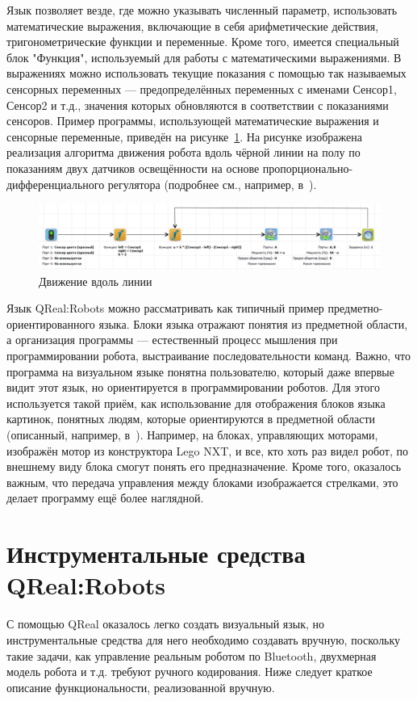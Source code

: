 \documentclass[a4paper]{article}
\begin{document}
Язык позволяет везде, где можно указывать численный параметр, использовать математические выражения, включающие в себя арифметические действия, тригонометрические функции и переменные. Кроме того, имеется специальный блок "Функция", используемый для работы с математическими выражениями. В выражениях можно использовать текущие показания с помощью так называемых сенсорных переменных --- предопределённых переменных с именами Сенсор1, Сенсор2 и т.д., значения которых обновляются в соответствии с показаниями сенсоров. Пример программы, использующей математические выражения и сенсорные переменные, приведён на рисунке~\ref{movingAlongTheLine}. На рисунке изображена реализация алгоритма движения робота вдоль чёрной линии на полу по показаниям двух датчиков освещённости на основе пропорционально-дифференциального регулятора (подробнее см., например, в~\cite{filippov}).

\begin{figure} [ht]
  \begin{center}
    \includegraphics[width=\textwidth]{movingAlongTheLine.png}
    \caption{Движение вдоль линии}
    \label{movingAlongTheLine}
  \end{center}
\end{figure}

Язык QReal:Robots можно рассматривать как типичный пример предметно-ориентированного языка. Блоки языка отражают понятия из предметной области, а организация программы --- естественный процесс мышления при программировании робота, выстраивание последовательности команд. Важно, что программа на визуальном языке понятна пользователю, который даже впервые видит этот язык, но ориентируется в программировании роботов. Для этого используется такой приём, как использование для отображения блоков языка картинок, понятных людям, которые ориентируются в предметной области (описанный, например, в~\cite{theBook}). Например, на блоках, управляющих моторами, изображён мотор из конструктора Lego NXT, и все, кто хоть раз видел робот, по внешнему виду блока смогут понять его предназначение. Кроме того, оказалось важным, что передача управления между блоками изображается стрелками, это делает программу ещё более наглядной.

\section{Инструментальные средства QReal:Robots}
С помощью QReal оказалось легко создать визуальный язык, но инструментальные средства для него необходимо создавать вручную, поскольку такие задачи, как управление реальным роботом по Bluetooth, двухмерная модель робота и т.д. требуют ручного кодирования. Ниже следует краткое описание функциональности, реализованной вручную.
\end{document}
